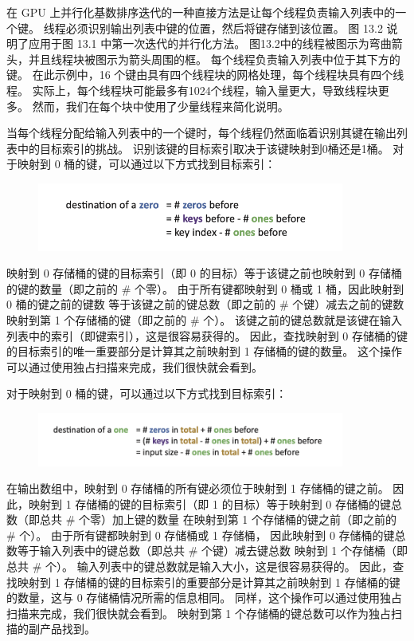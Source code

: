 在 GPU 上并行化基数排序迭代的一种直接方法是让每个线程负责输入列表中的一个键。 
线程必须识别输出列表中键的位置，然后将键存储到该位置。 图 13.2 说明了应用于图 13.1 中第一次迭代的并行化方法。 
图13.2中的线程被图示为弯曲箭头，并且线程块被图示为箭头周围的框。 每个线程负责输入列表中位于其下方的键。 
在此示例中，16 个键由具有四个线程块的网格处理，每个线程块具有四个线程。 
实际上，每个线程块可能最多有1024个线程，输入量更大，导致线程块更多。 然而，我们在每个块中使用了少量线程来简化说明。

当每个线程分配给输入列表中的一个键时，每个线程仍然面临着识别其键在输出列表中的目标索引的挑战。 
识别该键的目标索引取决于该键映射到0桶还是1桶。 对于映射到 0 桶的键，可以通过以下方式找到目标索引：

\begin{figure}[H]
	\centering
	\includegraphics[width=0.9\textwidth]{figs/F13-a1.png}
\end{figure}

映射到 0 存储桶的键的目标索引（即 0 的目标）等于该键之前也映射到 0 存储桶的键的数量（即之前的 \# 个零）。 
由于所有键都映射到 0 桶或 1 桶，因此映射到 0 桶的键之前的键数
等于该键之前的键总数（即之前的 \# 个键）减去之前的键数 映射到第 1 个存储桶的键（即之前的 \# 个）。 
该键之前的键总数就是该键在输入列表中的索引（即键索引），这是很容易获得的。 
因此，查找映射到 0 存储桶的键的目标索引的唯一重要部分是计算其之前映射到 1 存储桶的键的数量。 
这个操作可以通过使用独占扫描来完成，我们很快就会看到。

对于映射到 0 桶的键，可以通过以下方式找到目标索引：

\begin{figure}[H]
	\centering
	\includegraphics[width=0.9\textwidth]{figs/F13-a2.png}
\end{figure}

在输出数组中，映射到 0 存储桶的所有键必须位于映射到 1 存储桶的键之前。 
因此，映射到 1 存储桶的键的目标索引（即 1 的目标）等于映射到 0 存储桶的键总数（即总共 \# 个零）加上键的数量 在映射到第 1 个存储桶的键之前（即之前的 \# 个）。 
由于所有键都映射到 0 存储桶或 1 存储桶，
因此映射到 0 存储桶的键总数等于输入列表中的键总数（即总共 \# 个键）减去键总数 映射到 1 个存储桶（即总共 \# 个）。 
输入列表中的键总数就是输入大小，这是很容易获得的。 
因此，查找映射到 1 存储桶的键的目标索引的重要部分是计算其之前映射到 1 存储桶的键的数量，这与 0 存储桶情况所需的信息相同。 
同样，这个操作可以通过使用独占扫描来完成，我们很快就会看到。 映射到第 1 个存储桶的键总数可以作为独占扫描的副产品找到。

